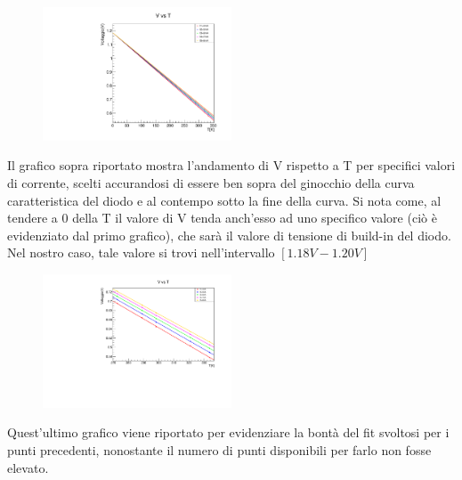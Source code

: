 \documentclass[10pt,twocolumn]{article}
\begin{document}
\begin{figure}[H] %
  \centering
  \includegraphics[width=0.5\textwidth]{V_vs_T.pdf} %
  \label{fig:V}
\end{figure}
Il grafico sopra riportato mostra l'andamento di V rispetto a T
per specifici valori di corrente, scelti accurandosi di essere ben sopra del ginocchio della curva caratteristica del diodo
e al contempo sotto la fine della curva.
Si nota come, al tendere a 0 della T il valore di V tenda anch'esso ad uno specifico valore (ciò è evidenziato dal primo grafico), che sarà il valore
di tensione di build-in del diodo. Nel nostro caso, tale valore si trovi nell'intervallo $[1.18V-1.20V]$
\begin{figure} [H]%
  \centering
  \includegraphics[width=0.5\textwidth]{V_vs_T_lim.pdf} %
  \label{fig:V_I_}
\end{figure}

Quest'ultimo grafico viene riportato per evidenziare la bontà del fit svoltosi per i punti precedenti, 
nonostante il numero di punti disponibili per farlo non fosse elevato.
\end{document}
